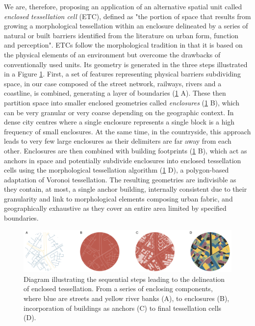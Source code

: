 We are, therefore, proposing an application of an alternative spatial unit called \textit{enclosed
tessellation cell} (ETC), defined as "the portion of space that results
from growing a morphological tessellation within an enclosure delineated by a series
of natural or built barriers identified from the literature on urban form, function and
perception"\cite{dab_mf_2021a}.
ETCs follow the morphological tradition in that it is
based on the physical elements of an environment but overcome the drawbacks of
conventionally used units. Its geometry is generated in the three steps illustrated in a
Figure \ref{fig:et_diagram}. First, a set of features representing physical barriers
subdividing space, in our case composed of the street network, railways, rivers and a
coastline, is combined, generating a layer of boundaries (\ref{fig:et_diagram} A).
These then partition space
into smaller enclosed geometries called \textit{enclosures} (\ref{fig:et_diagram} B),
which can be very granular
or very coarse depending on the geographic context. In dense city centres where a single
enclosure represents a single block is a high frequency of small enclosures. At the same time, in the
countryside, this approach leads to very few large enclosures as their delimiters are far away
from each other. Enclosures are then combined with building footprints (\ref{fig:et_diagram} B),
which act as
anchors in space and potentially subdivide enclosures into enclosed tessellation cells using the
morphological tessellation algorithm\cite{fleischmann2020} (\ref{fig:et_diagram} D),
a polygon-based adaptation of Voronoi
tessellation. The resulting geometries are indivisible as they contain, at most, a single
anchor building, internally consistent due to their granularity and link to morphological
elements composing urban fabric, and geographically exhaustive as they cover an entire area
limited by specified boundaries.

\begin{figure}
    \includegraphics[width=\linewidth]{fig/et_diagram.pdf}
    \caption{Diagram illustrating the sequential steps leading to the delineation of
    enclosed tessellation. From a series of enclosing components, where blue are streets
    and yellow river banks (A), to enclosures (B), incorporation of buildings as anchors
    (C) to final tessellation cells (D).}
    \label{fig:et_diagram}
\end{figure}

